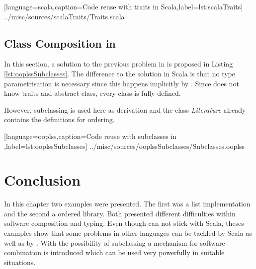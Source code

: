 
[language=scala,caption=Code reuse with traits in Scala,label=lst:scalaTraits]
{../misc/sources/scalaTraits/Traits.scala}

\subsection{Class Composition in \ooplss}
In this section, a solution to the previous problem in \ooplss is proposed in Listing
\ref{lst:ooplssSubclasses}. The difference to the solution in
Scala is that no type parametrisation is necessary since this happens
implicitly by \mytype. Since \ooplss does not know traits and abstract
class, every class is fully defined.

However, subclassing is used here as derivation and the class
\emph{Literature} already contains the definitions for ordering.


[language=ooplss,caption=Code reuse with subclasses in \ooplss,label=lst:ooplssSubclasses]
{../misc/sources/ooplssSubclasses/Subclasses.ooplss}

\section{Conclusion}
In this chapter two examples were presented. The first was a list
implementation and the second a ordered library. Both presented
different difficulties within software composition and typing. Even
though \ooplss can not stick with Scala, theses examples show
that some problems in other languages can be tackled by Scala as well
as by \ooplss. With the possibility of subclassing a mechanism for
software combination is introduced which can be used very powerfully in
suitable situations.
